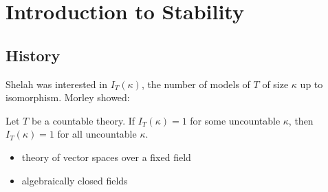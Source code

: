\documentclass{article}
\begin{document}
\maketitle

\tableofcontents

\clearpage

\section{Introduction to Stability}
\subsection{History}
Shelah was interested in $I_T(\kappa)$, the number of models of $T$ of size $\kappa$ up to isomorphism.
Morley showed:
\begin{thm}
  Let $T$ be a countable theory.
  If $I_T(\kappa) = 1$ for some uncountable $\kappa$, then $I_T(\kappa)=1$ for all uncountable $\kappa$.
\end{thm}
\begin{eg}\leavevmode
  \begin{itemize}
    \item theory of vector spaces over a fixed field
    \item algebraically closed fields
  \end{itemize}
\end{eg}
\end{document}
